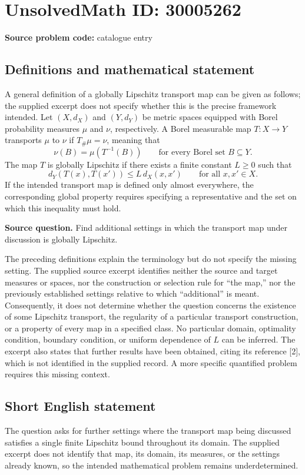 \documentclass[11pt]{article}
\begin{document}
\section*{UnsolvedMath ID: 30005262}
\textbf{Source problem code:} catalogue entry
\subsection{Definitions and mathematical statement}
A general definition of a globally Lipschitz transport map can be given as follows; the supplied excerpt does not specify whether this is the precise framework intended. Let \((X,d_X)\) and \((Y,d_Y)\) be metric spaces equipped with Borel probability measures \(\mu\) and \(\nu\), respectively. A Borel measurable map \(T:X\to Y\) transports \(\mu\) to \(\nu\) if \(T_{\#}\mu=\nu\), meaning that
\[
\nu(B)=\mu(T^{-1}(B))\qquad\text{for every Borel set }B\subseteq Y.
\]
The map \(T\) is globally Lipschitz if there exists a finite constant \(L\geq 0\) such that
\[
d_Y(T(x),T(x'))\leq L\,d_X(x,x')\qquad\text{for all }x,x'\in X.
\]
If the intended transport map is defined only almost everywhere, the corresponding global property requires specifying a representative and the set on which this inequality must hold.

\textbf{Source question.} Find additional settings in which the transport map under discussion is globally Lipschitz.

The preceding definitions explain the terminology but do not specify the missing setting. The supplied source excerpt identifies neither the source and target measures or spaces, nor the construction or selection rule for ``the map,'' nor the previously established settings relative to which ``additional'' is meant. Consequently, it does not determine whether the question concerns the existence of some Lipschitz transport, the regularity of a particular transport construction, or a property of every map in a specified class. No particular domain, optimality condition, boundary condition, or uniform dependence of \(L\) can be inferred. The excerpt also states that further results have been obtained, citing its reference [2], which is not identified in the supplied record. A more specific quantified problem requires this missing context.
\subsection{Short English statement}
The question asks for further settings where the transport map being discussed satisfies a single finite Lipschitz bound throughout its domain. The supplied excerpt does not identify that map, its domain, its measures, or the settings already known, so the intended mathematical problem remains underdetermined.
\end{document}
